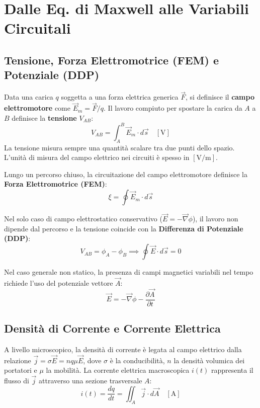 \documentclass[12pt, a4paper]{report}
\begin{document}
\section{Dalle Eq. di Maxwell alle Variabili Circuitali}
\subsection{Tensione, Forza Elettromotrice (FEM) e Potenziale (DDP)}
Data una carica $q$ soggetta a una forza elettrica generica $\vec{F}$, si definisce il \textbf{campo elettromotore} come $\vec{E}_m = \vec{F}/q$. Il lavoro compiuto per spostare la carica da $A$ a $B$ definisce la \textbf{tensione} $V_{AB}$:
\begin{equation}
    V_{AB} = \int_{A}^{B} \vec{E}_m \cdot d\vec{s} \quad [\mathrm{V}]
\end{equation}
La tensione misura sempre una quantità scalare tra due punti dello spazio. L'unità di misura del campo elettrico nei circuiti è spesso in $[\mathrm{V/m}]$.


Lungo un percorso chiuso, la circuitazione del campo elettromotore definisce la \textbf{Forza Elettromotrice (FEM)}:
\begin{equation}
    \xi = \oint \vec{E}_m \cdot d\vec{s}
\end{equation}

Nel solo caso di campo elettrostatico conservativo ($\vec{E} = -\vec{\nabla}\phi$), il lavoro non dipende dal percorso e la tensione coincide con la \textbf{Differenza di Potenziale (DDP)}:
\begin{equation}
    V_{AB} = \phi_A - \phi_B \implies \oint \vec{E} \cdot d\vec{s} = 0
\end{equation}

Nel caso generale non statico, la presenza di campi magnetici variabili nel tempo richiede l'uso del potenziale vettore $\vec{A}$:
\begin{equation}
    \vec{E} = -\vec{\nabla}\phi - \frac{\partial \vec{A}}{\partial t}
\end{equation}

\subsection{Densità di Corrente e Corrente Elettrica}
A livello microscopico, la densità di corrente è legata al campo elettrico dalla relazione $\vec{j} = \sigma \vec{E} = n q \mu \vec{E}$, dove $\sigma$ è la conducibilità, $n$ la densità volumica dei portatori e $\mu$ la mobilità. La corrente elettrica macroscopica $i(t)$ rappresenta il flusso di $\vec{j}$ attraverso una sezione trasversale $A$:
\begin{equation}
    i(t) = \frac{dq}{dt} = \iint_{A} \vec{j} \cdot d\vec{A} \quad [\mathrm{A}]
\end{equation}
\end{document}
